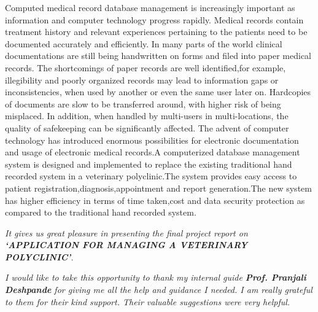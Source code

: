 \documentclass[oneside,a4paper,12pt]{book}
\begin{document}
{   \setlength{\parindent}{11mm} }
{ \setlength{\parindent}{0mm} }
\vspace{20mm}
{\fontsize{25pt}{25pt}
Computed medical record database management is increasingly important as information and computer technology progress rapidly. Medical records contain treatment history and relevant experiences pertaining to the patients need to be documented accurately and efficiently. In many parts of the world clinical documentations are still being handwritten on forms and filed into paper medical
records. The shortcomings of paper records are well identified,for example, illegibility and poorly organized records may lead to information gaps or inconsistencies, when used by another or even the same user later on. Hardcopies of documents are slow to be transferred around, with higher risk of being misplaced. In
addition, when handled by multi-users in multi-locations, the quality of safekeeping can be significantly affected. The advent of computer technology has introduced enormous possibilities for electronic documentation and usage of electronic medical records.A computerized database management system is designed and implemented to replace the existing traditional hand recorded system in a veterinary polyclinic.The system provides easy access to patient registration,diagnosis,appointment and report generation.The new system has higher efficiency in terms of time taken,cost and data security protection as compared to the traditional hand recorded system.}



{   \setlength{\parindent}{11mm} }
{ \setlength{\parindent}{0mm} }

\textit{It gives us great pleasure in presenting the final project report 
on {\bfseries \fontsize{12}{12} \selectfont `APPLICATION FOR MANAGING A VETERINARY POLYCLINIC'}.}
\vspace*{1.5\baselineskip}

 \textit{I would like to take this opportunity to thank my internal guide
 \textbf{Prof. Pranjali Deshpande} for giving me all the help and guidance I needed. I am
 really grateful to them for their kind support. Their valuable suggestions were very helpful.} \vspace*{1.5\baselineskip}
\end{document}
